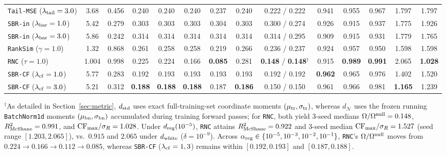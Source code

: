\documentclass[preprint,11pt,a4paper]{elsarticle}
\begin{document}
\begin{table}[ht!]
{\begin{tabular}{lccccccccccccc}
\texttt{Tail-MSE} ($\lambda_{\rm tail}=3.0$) & 3.68 & 0.456 & 0.240 & 0.240 & 0.240 & 0.237 & 0.240 & 0.222 / 0.222 & 0.941 & 0.955 & 0.967 & 1.797 & 1.797 \\
\texttt{SBR-in} ($\lambda_{\rm bar}=1.0$) & 5.42 & 0.279 & 0.303 & 0.303 & 0.303 & 0.304 & 0.303 & 0.300 / 0.274 & 0.926 & 0.915 & 0.937 & 1.775 & 1.926 \\
\texttt{SBR-in} ($\lambda_{\rm bar}=3.0$) & 5.86 & 0.242 & 0.314 & 0.314 & 0.314 & 0.314 & 0.314 & 0.314 / 0.295 & 0.909 & 0.915 & 0.931 & 1.779 & 1.765 \\
\texttt{RankSim} ($\gamma=1.0$) & 1.32 & 0.868 & 0.261 & 0.258 & 0.258 & 0.219 & 0.266 & 0.236 / 0.237 & 0.924 & 0.957 & 0.950 & 1.598 & 1.598 \\
\texttt{RNC} ($\tau=1.0$) & 1.004 & 0.998 & 0.225 & 0.224 & 0.166 & \textbf{0.085} & 0.281 & \textbf{0.148} / \textbf{0.148}$^\dagger$ & 0.915 & \textbf{0.989} & \textbf{0.991} & 2.065 & \textbf{1.028} \\
\texttt{SBR-CF} ($\lambda_{\rm cf}=1.0$) & 5.77 & 0.283 & 0.192 & 0.193 & 0.193 & 0.193 & 0.193 & 0.192 / 0.192 & \textbf{0.962} & 0.965 & 0.976 & 1.402 & 1.520 \\
\texttt{SBR-CF} ($\lambda_{\rm cf}=3.0$) & 5.21 & 0.312 & \textbf{0.188} & \textbf{0.188} & \textbf{0.188} & 0.187 & \textbf{0.186} & 0.150 / 0.150 & 0.961 & 0.966 & 0.981 & \textbf{1.165} & 1.239 \\
\bottomrule
\end{tabular}%
}
\par\smallskip\raggedright{\footnotesize $^\dagger$As detailed in Section~\ref{sec:metric}, $d_{\rm std}$ uses exact full-training-set coordinate moments $(\mu_{\rm tr},\sigma_{\rm tr})$, whereas $d_{\mathcal N}$ uses the frozen running \texttt{BatchNorm1d} moments $(\mu_{\rm bn},\sigma_{\rm bn})$ accumulated during training forward passes; for \texttt{RNC}, both yield 3-seed medians $\Omega/\Omega^{\rm null}=0.148$, $R^2_{\rm McShane}=0.991$, and ${\rm CF}_{\max}/\sigma_R=1.028$. Under $d_{\rm reg}(10^{-5})$, \texttt{RNC} attains $R^2_{\rm McShane}=0.922$ and 3-seed median ${\rm CF}_{\max}/\sigma_R=1.527$ (seed range $[1.203,2.065]$), vs.\ $0.915$ and $2.065$ under $d_{\rm white}$ ($\delta=10^{-9}$). Across $\alpha_{\rm reg}\in\{10^{-5},10^{-3},10^{-2},10^{-1}\}$, \texttt{RNC}'s $\Omega/\Omega^{\rm null}$ moves from $0.224\to 0.166\to 0.112\to 0.085$, whereas \texttt{SBR-CF} ($\lambda_{\rm cf}=1,3$) remains within $[0.192,0.193]$ and $[0.187,0.188]$.}
\end{table}
\end{document}
